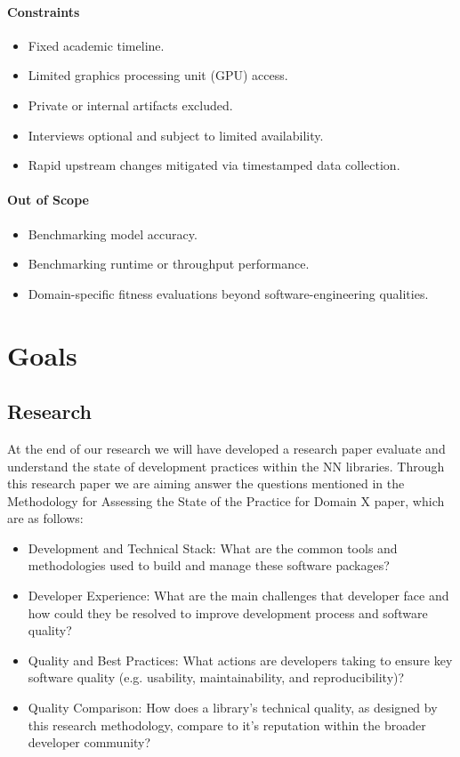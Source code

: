 \documentclass{article}
\begin{document}
\paragraph{Constraints}
\begin{itemize}
  \item Fixed academic timeline.
  \item Limited graphics processing unit (GPU) access.
  \item Private or internal artifacts excluded.
  \item Interviews optional and subject to limited availability.
  \item Rapid upstream changes mitigated via timestamped data collection.
\end{itemize}

\paragraph{Out of Scope}
\begin{itemize}
  \item Benchmarking model accuracy.
  \item Benchmarking runtime or throughput performance.
  \item Domain-specific fitness evaluations beyond software-engineering qualities.
\end{itemize}


\section{Goals}
\subsection{Research}
At the end of our research we will have developed a research paper evaluate and understand the state of development practices within the NN libraries. Through this research paper we are aiming answer the questions mentioned in the Methodology for Assessing the State of the Practice for Domain X paper, which are as follows:
\begin{itemize}
    \item Development and Technical Stack: What are the common tools and methodologies used to build and manage these software packages?
    \item Developer Experience: What are the main challenges that developer face and how could they be resolved to improve development process and software quality?
    \item Quality and Best Practices: What actions are developers taking to ensure key software quality (e.g. usability, maintainability, and reproducibility)?
    \item Quality Comparison: How does a library's technical quality, as designed by this research methodology, compare to it's reputation within the broader developer community?
\end{itemize}
\end{document}
